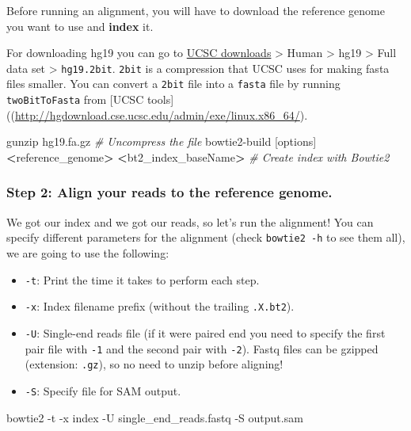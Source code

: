 \documentclass[]{article}
\newenvironment{Shaded}{\begin{snugshade}}{\end{snugshade}}
\newcommand{\CommentTok}[1]{\textcolor[rgb]{0.56,0.35,0.01}{\textit{#1}}}
\newcommand{\FunctionTok}[1]{\textcolor[rgb]{0.00,0.00,0.00}{#1}}
\newcommand{\OperatorTok}[1]{\textcolor[rgb]{0.81,0.36,0.00}{\textbf{#1}}}
\newcommand{\ExtensionTok}[1]{#1}
\newcommand{\NormalTok}[1]{#1}
\providecommand{\tightlist}{%
  \setlength{\itemsep}{0pt}\setlength{\parskip}{0pt}}
\begin{document}
Before running an alignment, you will have to download the reference
genome you want to use and \textbf{index} it.

For downloading hg19 you can go to
\href{http://hgdownload.cse.ucsc.edu/downloads.html}{UCSC downloads}
\textgreater{} Human \textgreater{} hg19 \textgreater{} Full data set
\textgreater{} \texttt{hg19.2bit}. \texttt{2bit} is a compression that
UCSC uses for making fasta files smaller. You can convert a
\texttt{2bit} file into a \texttt{fasta} file by running
\texttt{twoBitToFasta} from {[}UCSC
tools{]}((\url{http://hgdownload.cse.ucsc.edu/admin/exe/linux.x86_64/}).

\begin{Shaded}
\begin{Highlighting}[]
\FunctionTok{gunzip}\NormalTok{ hg19.fa.gz }\CommentTok{# Uncompress the file}
\ExtensionTok{bowtie2-build}\NormalTok{ [options] }\OperatorTok{<}\NormalTok{reference_genome}\OperatorTok{>} \OperatorTok{<}\NormalTok{bt2_index_baseName}\OperatorTok{>} \CommentTok{# Create index with Bowtie2}
\end{Highlighting}
\end{Shaded}

\subsubsection{Step 2: Align your reads to the reference
genome.}\label{step-2-align-your-reads-to-the-reference-genome.}

We got our index and we got our reads, so let's run the alignment! You
can specify different parameters for the alignment (check
\texttt{bowtie2\ -h} to see them all), we are going to use the
following:

\begin{itemize}
\tightlist
\item
  \texttt{-t}: Print the time it takes to perform each step.
\item
  \texttt{-x}: Index filename prefix (without the trailing
  \texttt{.X.bt2}).
\item
  \texttt{-U}: Single-end reads file (if it were paired end you need to
  specify the first pair file with \texttt{-1} and the second pair with
  \texttt{-2}). Fastq files can be gzipped (extension: \texttt{.gz}), so
  no need to unzip before aligning!
\item
  \texttt{-S}: Specify file for SAM output.
\end{itemize}

\begin{Shaded}
\begin{Highlighting}[]
\ExtensionTok{bowtie2}\NormalTok{ -t -x index -U single_end_reads.fastq -S output.sam}
\end{Highlighting}
\end{Shaded}
\end{document}
